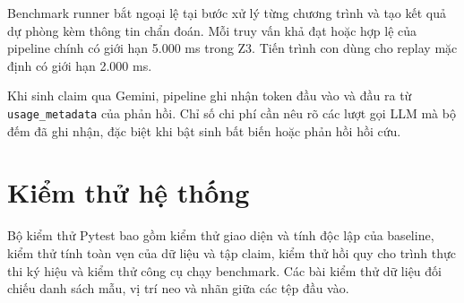 Benchmark runner bắt ngoại lệ tại bước xử lý từng chương trình và tạo kết quả dự phòng kèm thông tin chẩn đoán. Mỗi truy vấn khả đạt hoặc hợp lệ của pipeline chính có giới hạn 5.000 ms trong Z3. Tiến trình con dùng cho replay mặc định có giới hạn 2.000 ms.

Khi sinh claim qua Gemini, pipeline ghi nhận token đầu vào và đầu ra từ \texttt{usage\_metadata} của phản hồi. Chỉ số chi phí cần nêu rõ các lượt gọi LLM mà bộ đếm đã ghi nhận, đặc biệt khi bật sinh bất biến hoặc phản hồi hồi cứu.

\section{Kiểm thử hệ thống}
\label{sec:testing_quality_assurance}

Bộ kiểm thử Pytest bao gồm kiểm thử giao diện và tính độc lập của baseline, kiểm thử tính toàn vẹn của dữ liệu và tập claim, kiểm thử hồi quy cho trình thực thi ký hiệu và kiểm thử công cụ chạy benchmark. Các bài kiểm thử dữ liệu đối chiếu danh sách mẫu, vị trí neo và nhãn giữa các tệp đầu vào.
